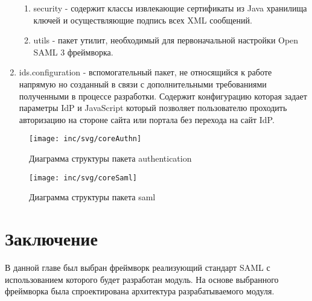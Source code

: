 \begin{enumerate}
\begin{enumerate}
\item security - содержит классы извлекающие сертификаты из Java хранилища ключей и осуществляющие подпись всех XML сообщений.
\item utils - пакет утилит, необходимый для первоначальной настройки Open SAML 3 фреймворка.
\end{enumerate}
\item ids.configuration - вспомогательный пакет, не относящийся к работе напрямую но созданный в связи с дополнительными требованиями полученными в процессе разработки. Содержит конфигурацию которая задает параметры IdP и JavaScript который позволяет пользователю проходить авторизацию на стороне сайта или портала без перехода на сайт IdP.
\end{enumerate}		

\begin{figure}[h]
  \centering
  \texttt{[image: inc/svg/coreAuthn]}
  \caption{Диаграмма структуры пакета authentication}
  \label{fig:coreAuthn}
\end{figure}

\begin{figure}[H]
  \centering
  \texttt{[image: inc/svg/coreSaml]}
  \caption{Диаграмма структуры пакета saml}
  \label{fig:coreSaml}
\end{figure}

\section{Заключение}
В данной главе был выбран фреймворк реализующий стандарт SAML с использованием которого будет разработан модуль. На основе выбранного фреймворка была спроектирована архитектура разрабатываемого модуля.

